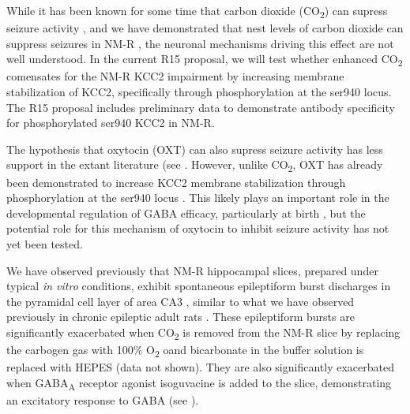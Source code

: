 \documentclass[11pt]{nih}
\begin{document}
\par While it has been known for some time that carbon dioxide (CO\textsubscript{2}) can supress seizure activity \cite{petroianu_2020_singultus}, and we have demonstrated that nest levels of carbon dioxide can suppress seizures in NM-R \cite{zions_2020_nest}, the neuronal mechanisms driving this effect are not well understood. In the current R15 proposal, we will test whether enhanced CO\textsubscript{2} comensates for the NM-R KCC2 impairment by increasing membrane stabilization of KCC2, specifically through phosphorylation at the ser940 locus. The R15 proposal includes preliminary data to demonstrate antibody specificity for phosphorylated ser940 KCC2 in NM-R.
\par The hypothesis that oxytocin (OXT) can also supress seizure activity has less support in the extant literature (see \cite{loyens_2012_proconvulsive,  erbas_2013_oxytocin, panaitescu_2018_oxytocin, wong_2021_nanoparticle}. However, unlike CO\textsubscript{2}, OXT has already been demonstrated to increase KCC2 membrane stabilization through phosphorylation at the ser940 locus \cite{leonzino_2016_timing}. This likely plays an important role in the developmental regulation of GABA efficacy, particularly at birth \cite{tyzio_2006_maternal}, but the potential role for this mechanism of oxytocin to inhibit seizure activity has not yet been tested. 
\par We have observed previously that NM-R hippocampal slices, prepared under typical \textit{in vitro} conditions, exhibit spontaneous epileptiform burst discharges in the pyramidal cell layer of area CA3 \cite{zions_2020_nest}, similar to what we have observed previously in chronic epileptic adult rats \cite{McCloskey2011-sm}. These epileptiform bursts are significantly exacerbated when CO\textsubscript{2} is removed from the NM-R slice by replacing the carbogen gas with 100\% O\textsubscript{2} oand bicarbonate in the buffer solution is replaced with HEPES (data not shown). They are also significantly exacerbated when GABA\textsubscript{A} receptor agonist isoguvacine is added to the slice, demonstrating an excitatory response to GABA (see \cite{zions_2020_nest}).
\end{document}
